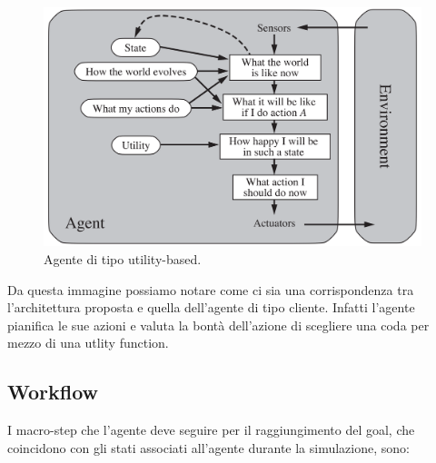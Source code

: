 \begin{figure}[H]
	\centering
	\includegraphics[width=11cm]{"images/utility-based_architecture.png"}
	\caption{Agente di tipo utility-based.}
	\label{fig:utility-based}
\end{figure}

Da questa immagine possiamo notare come ci sia una corrispondenza tra l'architettura proposta e quella dell'agente di tipo cliente. Infatti l'agente pianifica le sue azioni e valuta la bontà dell'azione di scegliere una coda per mezzo di una utlity function.

\subsection{Workflow}
I macro-step che l'agente deve seguire per il raggiungimento del goal, che coincidono con gli stati associati all'agente durante la simulazione, sono:

